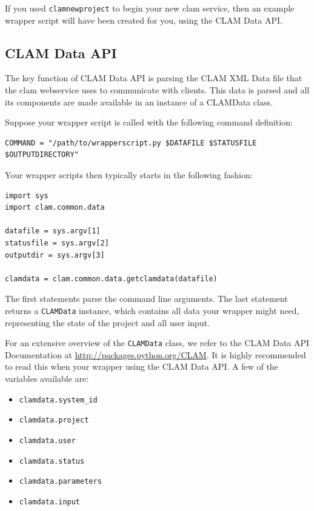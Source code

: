 \documentclass[a4paper,12pt]{report}
\begin{document}
If you used \texttt{clamnewproject} to begin your new clam service, then an example
wrapper script will have been created for you, using the CLAM Data API.

\subsection{CLAM Data API}

The key function of CLAM Data API is parsing the CLAM XML Data file that the
clam webservice uses to communicate with clients. This data is parsed and all
its components are made available in an instance of a CLAMData class.

Suppose your wrapper script is called with the following command definition:

\begin{verbatim}
COMMAND = "/path/to/wrapperscript.py $DATAFILE $STATUSFILE $OUTPUTDIRECTORY" 
\end{verbatim}


Your wrapper scripts then typically starts in the following fashion:


\begin{verbatim}
import sys
import clam.common.data

datafile = sys.argv[1]
statusfile = sys.argv[2]
outputdir = sys.argv[3]

clamdata = clam.common.data.getclamdata(datafile)
\end{verbatim}

The first statements parse the command line arguments. The last statement
returns a \texttt{CLAMData} instance, which contains all data your wrapper might need,
representing the state of the project and all user input.

For an extensive overview of the \texttt{CLAMData} class, we refer to the CLAM
Data API Documentation at \url{http://packages.python.org/CLAM}. It is highly
recommended to read this when your wrapper using the CLAM Data API. A few of the
variables available are:

\begin{itemize}
\item \texttt{clamdata.system\_id}
\item \texttt{clamdata.project}
\item \texttt{clamdata.user}
\item \texttt{clamdata.status}
\item \texttt{clamdata.parameters}
\item \texttt{clamdata.input}
\end{itemize}
\end{document}
